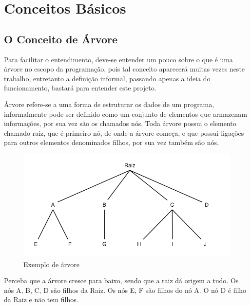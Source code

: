 
\chapter{Conceitos Básicos}
\label{cap:Conceitos Básicos}

\section{O Conceito de Árvore}

Para facilitar o entendimento, deve-se entender um pouco sobre o que
é uma árvore no escopo da programação, pois tal conceito aparecerá muitas
vezes neste trabalho, entretanto a definição informal, passando apenas a ideia 
do funcionamento, bastará para entender este projeto.

Árvore refere-se a uma forma de estruturar os dados de um programa,
informalmente pode ser definido como um conjunto de elementos que armazenam 
informações, por sua vez são os chamados nós. Toda árvore possui o elemento 
chamado raiz, que é primeiro nó, de onde a árvore começa, e que possui ligações
para outros elementos denominados filhos, por sua vez também são nós.

\begin{figure}[h]
    \includegraphics[width=\linewidth]{../figuras/arvore.png}
    \caption{Exemplo de árvore}
\end{figure}   

Perceba que a árvore cresce para baixo, sendo que a raiz dá origem a tudo.
Os nós A, B, C, D são filhos da Raiz. Os nós E, F são filhos do nó A. O nó
D é filho da Raiz e não tem filhos.

